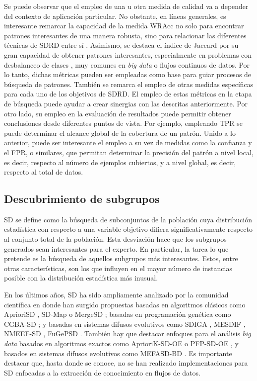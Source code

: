 \documentclass[c5paper,10pt,twoside]{book}	   	%
\begin{document}
Se puede observar que el empleo de una u otra medida de calidad va a depender del contexto de aplicación particular. No obstante, en líneas generales, es interesante remarcar la capacidad de la medida \ac{WRAcc} no solo para encontrar patrones interesantes de una manera robusta, sino para relacionar las diferentes técnicas de \ac{SDRD} entre sí \cite{Cdh18}. Asimismo, se destaca el índice de Jaccard por su gran capacidad de obtener patrones interesantes, especialmente en problemas con desbalanceo de clases \cite{Lmcg16}, muy comunes en \textit{big data} o flujos continuos de datos. Por lo tanto, dichas métricas pueden ser empleadas como base para guiar procesos de búsqueda de patrones. También se remarca el empleo de otras medidas específicas para cada uno de los objetivos de \ac{SDRD}. El empleo de estas métricas en la etapa de búsqueda puede ayudar a crear sinergias con las descritas anteriormente. Por otro lado, su empleo en la evaluación de resultados puede permitir obtener conclusiones desde diferentes puntos de vista. Por ejemplo, empleando \ac{TPR} se puede determinar el alcance global de la cobertura de un patrón. Unido a lo anterior, puede ser interesante el empleo a su vez de medidas como la confianza y el \ac{FPR}, o similares, que permitan determinar la precisión del patrón a nivel local, es decir, respecto al número de ejemplos cubiertos, y a nivel global, es decir, respecto al total de datos.

\subsection{Descubrimiento de subgrupos}

\ac{SD} \cite{Klo96,Wro97} se define como la búsqueda de subconjuntos de la población cuya distribución estadística con respecto a una variable objetivo difiera significativamente respecto al conjunto total de la población. Esta desviación hace que los subgrupos generados sean interesantes para el experto. En particular, la tarea lo que pretende es la búsqueda de aquellos subgrupos más interesantes. Estos, entre otras características, son los que influyen en el mayor número de instancias posible con la distribución estadística más inusual. 


En los últimos años, \ac{SD} ha sido ampliamente analizado por la comunidad científica \cite{Hcgd11,Cgdh14,Atz15} en donde han surgido propuestas basadas en algoritmos clásicos como AprioriSD \cite{Kl06}, SD-Map \cite{Ap06} o MergeSD \cite{Grw08}; basadas en programación genética como CGBA-SD \cite{Lrrv14}; y basadas en sistemas difusos evolutivos como SDIGA \cite{Dghm07}, MESDIF \cite{Dgh07}, NMEEF-SD \cite{Cgdh10}, FuGePSD \cite{Crdwgge15}. También hay que destacar enfoques para el análisis \textit{big data} basados en algoritmos exactos como AprioriK-SD-OE o PFP-SD-OE \cite{Plv17b}, y basados en sistemas difusos evolutivos como MEFASD-BD \cite{Prpgcd16}. Es importante destacar que, hasta donde se conoce, no se han realizado implementaciones para \ac{SD} enfocadas a la extracción de conocimiento en flujos de datos.
\end{document}
